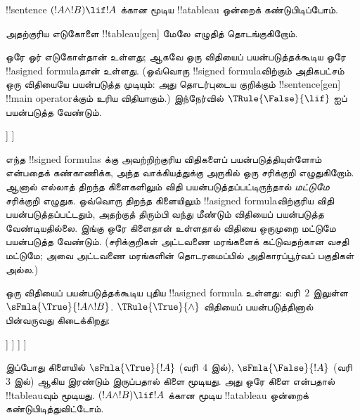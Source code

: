 \documentclass[../../../include/open-logic-section]{subfiles}
\begin{document}
      {}
      {}


\begin{ex}
!!{sentence} $(!A \land !B) \lif !A$ க்கான மூடிய !!a{tableau} ஒன்றைக்
கண்டுபிடிப்போம்.

அதற்குரிய எடுகோளை !!{tableau}[gen] மேலே எழுதித் தொடங்குகிறோம்.
\begin{oltableau}
  [\sFmla{\False}{(\formula{A} \land \formula{B}) \lif \formula{A}},
    just = \TAss]
\end{oltableau}

ஒரே ஓர் எடுகோள்தான் உள்ளது; ஆகவே ஒரு விதியைப் பயன்படுத்தக்கூடிய ஒரே
!!a{signed formula}தான் உள்ளது. (ஒவ்வொரு !!{signed formula}விற்கும்
அதிகபட்சம் ஒரு விதியையே பயன்படுத்த முடியும்: அது தொடர்புடைய குறிக்கும்
!!{sentence}[gen] !!{main operator}க்கும் உரிய விதியாகும்.) இந்நேர்வில்
$\TRule{\False}{\lif}$ ஐப் பயன்படுத்த வேண்டும்.
\begin{oltableau}
  [\sFmla{\False}{(\formula{A} \land \formula{B}) \lif \formula{A}},
    checked, just = \TAss
    [\sFmla{\True}{\formula{A} \land \formula{B}},
      just={\TRule{\False}{\lif}[1]}
      [\sFmla{\False}{\formula{A}}, just={\TRule{\False}{\lif}[1]}]
    ]
  ]
\end{oltableau}
எந்த !!{signed formula}s க்கு அவற்றிற்குரிய விதிகளைப் பயன்படுத்தியுள்ளோம்
என்பதைக் கண்காணிக்க, அந்த வாக்கியத்துக்கு அருகில் ஒரு சரிக்குறி எழுதுகிறோம்.
ஆனால் எல்லாத் திறந்த கிளைகளிலும் விதி பயன்படுத்தப்பட்டிருந்தால்
\emph{மட்டுமே} சரிக்குறி எழுதுக. ஒவ்வொரு திறந்த கிளையிலும்
!!a{signed formula}விற்குரிய விதி பயன்படுத்தப்பட்டதும், அதற்குத் திரும்பி வந்து மீண்டும்
விதியைப் பயன்படுத்த வேண்டியதில்லை. இங்கு ஒரே கிளைதான் உள்ளதால் விதியை ஒருமுறை
மட்டுமே பயன்படுத்த வேண்டும். (சரிக்குறிகள் அட்டவணை மரங்களைக் கட்டுவதற்கான
வசதி மட்டுமே; அவை அட்டவணை மரங்களின் தொடரமைப்பில் அதிகாரப்பூர்வப் பகுதிகள் அல்ல.)

ஒரு விதியைப் பயன்படுத்தக்கூடிய புதிய !!a{signed formula} உள்ளது: வரி~$2$
இலுள்ள $\sFmla{\True}{!A \land !B}$. $\TRule{\True}{\land}$ விதியைப்
பயன்படுத்தினால் பின்வருவது கிடைக்கிறது:
\begin{oltableau}
  [\sFmla{\False}{(\formula{A} \land \formula{B}) \lif \formula{A}},
    checked, just = \TAss
    [\sFmla{\True}{\formula{A} \land \formula{B}},
      just={\TRule{\False}{\lif}[1]}, checked
      [\sFmla{\False}{\formula{A}}, just={\TRule{\False}{\lif}[1]}
        [\sFmla{\True}{\formula{A}}, just={\TRule{\True}{\land}[2]}
          [\sFmla{\True}{\formula{B}}, just={\TRule{\True}{\land}[2]}, close
          ]
        ]
      ]
    ]
  ]
\end{oltableau}
இப்போது கிளையில் $\sFmla{\True}{!A}$ (வரி~$4$ இல்),
$\sFmla{\False}{!A}$ (வரி~$3$ இல்) ஆகிய இரண்டும் இருப்பதால் கிளை மூடியது.
அது ஒரே கிளை என்பதால் !!{tableau}வும் மூடியது. $(!A \land !B) \lif !A$
க்கான மூடிய !!a{tableau} ஒன்றைக் கண்டுபிடித்துவிட்டோம்.
\end{ex}
\end{document}
